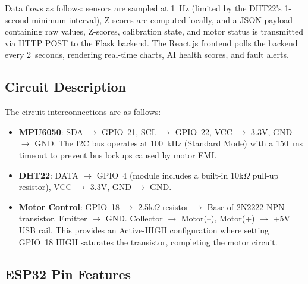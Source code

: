 \documentclass[conference]{IEEEtran}
\begin{document}
Data flows as follows: sensors are sampled at 1~Hz (limited by the DHT22's 1-second minimum interval), Z-scores are computed locally, and a JSON payload containing raw values, Z-scores, calibration state, and motor status is transmitted via HTTP POST to the Flask backend. The React.js frontend polls the backend every 2~seconds, rendering real-time charts, AI health scores, and fault alerts.

\subsection{Circuit Description}

The circuit interconnections are as follows:
\begin{itemize}
    \item \textbf{MPU6050}: SDA $\rightarrow$ GPIO~21, SCL $\rightarrow$ GPIO~22, VCC $\rightarrow$ 3.3V, GND $\rightarrow$ GND. The I2C bus operates at 100~kHz (Standard Mode) with a 150~ms timeout to prevent bus lockups caused by motor EMI.
    \item \textbf{DHT22}: DATA $\rightarrow$ GPIO~4 (module includes a built-in 10k$\Omega$ pull-up resistor), VCC $\rightarrow$ 3.3V, GND $\rightarrow$ GND.
    \item \textbf{Motor Control}: GPIO~18 $\rightarrow$ 2.5k$\Omega$ resistor $\rightarrow$ Base of 2N2222 NPN transistor. Emitter $\rightarrow$ GND. Collector $\rightarrow$ Motor(--), Motor(+) $\rightarrow$ +5V USB rail. This provides an Active-HIGH configuration where setting GPIO~18 HIGH saturates the transistor, completing the motor circuit.
\end{itemize}

\vspace{0.3cm}
\noindent{}
\vspace{0.2cm}

\vspace{0.3cm}
\noindent{}
\vspace{0.2cm}

\subsection{ESP32 Pin Features}
\end{document}
